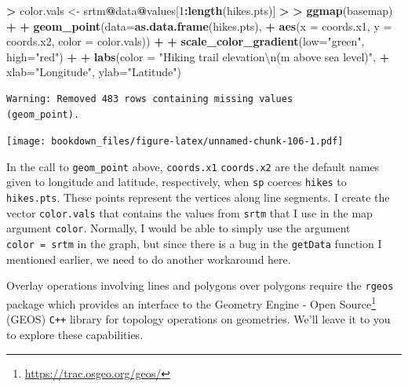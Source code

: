 \documentclass[]{krantz}
\makeatletter
\newenvironment{Shaded}{\begin{snugshade}}{\end{snugshade}}
\newcommand{\KeywordTok}[1]{\textcolor[rgb]{0.27,0.27,0.27}{\textbf{#1}}}
\newcommand{\DataTypeTok}[1]{\textcolor[rgb]{0.27,0.27,0.27}{#1}}
\newcommand{\DecValTok}[1]{\textcolor[rgb]{0.06,0.06,0.06}{#1}}
\newcommand{\CharTok}[1]{\textcolor[rgb]{0.5,0.5,0.5}{#1}}
\newcommand{\StringTok}[1]{\textcolor[rgb]{0.5,0.5,0.5}{#1}}
\newcommand{\OperatorTok}[1]{\textcolor[rgb]{0.43,0.43,0.43}{\textbf{#1}}}
\newcommand{\ErrorTok}[1]{\textcolor[rgb]{0.14,0.14,0.14}{\textbf{#1}}}
\newcommand{\NormalTok}[1]{#1}
\renewcommand{\href}[2]{#2\footnote{\url{#1}}}
\newenvironment{kframe}{%
\medskip{}
\setlength{\fboxsep}{.8em}
 \def\at@end@of@kframe{}%
 \ifinner\ifhmode%
  \def\at@end@of@kframe{\end{minipage}}%
  \begin{minipage}{\columnwidth}%
 \fi\fi%
 \def\FrameCommand##1{\hskip\@totalleftmargin \hskip-\fboxsep
 \colorbox{shadecolor}{##1}\hskip-\fboxsep
     \hskip-\linewidth \hskip-\@totalleftmargin \hskip\columnwidth}%
 \MakeFramed {\advance\hsize-\width
   \@totalleftmargin\z@ \linewidth\hsize
   \@setminipage}}%
 {\par\unskip\endMakeFramed%
 \at@end@of@kframe}
\renewenvironment{Shaded}{\begin{kframe}}{\end{kframe}}
\theoremstyle{definition}
\theoremstyle{definition}
\theoremstyle{definition}
\theoremstyle{remark}
\makeatother
\begin{document}
\begin{Shaded}
\begin{Highlighting}[]
\OperatorTok{>}\StringTok{ }\NormalTok{color.vals <-}\StringTok{ }\NormalTok{srtm}\OperatorTok{@}\NormalTok{data}\OperatorTok{@}\NormalTok{values[}\DecValTok{1}\OperatorTok{:}\KeywordTok{length}\NormalTok{(hikes.pts)]}
\OperatorTok{>}\StringTok{ }
\ErrorTok{>}\StringTok{ }\KeywordTok{ggmap}\NormalTok{(basemap) }\OperatorTok{+}
\OperatorTok{+}\StringTok{     }\KeywordTok{geom_point}\NormalTok{(}\DataTypeTok{data=}\KeywordTok{as.data.frame}\NormalTok{(hikes.pts),}
\OperatorTok{+}\StringTok{                }\KeywordTok{aes}\NormalTok{(}\DataTypeTok{x =}\NormalTok{ coords.x1, }\DataTypeTok{y =}\NormalTok{ coords.x2, }\DataTypeTok{color =}\NormalTok{ color.vals)) }\OperatorTok{+}
\OperatorTok{+}\StringTok{     }\KeywordTok{scale_color_gradient}\NormalTok{(}\DataTypeTok{low=}\StringTok{"green"}\NormalTok{, }\DataTypeTok{high=}\StringTok{"red"}\NormalTok{) }\OperatorTok{+}
\OperatorTok{+}\StringTok{     }\KeywordTok{labs}\NormalTok{(}\DataTypeTok{color =} \StringTok{"Hiking trail elevation}\CharTok{\textbackslash{}n}\StringTok{(m above sea level)"}\NormalTok{,}
\OperatorTok{+}\StringTok{          }\DataTypeTok{xlab=}\StringTok{"Longitude"}\NormalTok{, }\DataTypeTok{ylab=}\StringTok{"Latitude"}\NormalTok{)}
\end{Highlighting}
\end{Shaded}

\begin{verbatim}
Warning: Removed 483 rows containing missing values
(geom_point).
\end{verbatim}

\texttt{[image: bookdown\_files/figure-latex/unnamed-chunk-106-1.pdf]}

In the call to \texttt{geom\_point} above, \texttt{coords.x1}
\texttt{coords.x2} are the default names given to longitude and
latitude, respectively, when \texttt{sp} coerces \texttt{hikes} to
\texttt{hikes.pts}. These points represent the vertices along line
segments. I create the vector \texttt{color.vals} that contains the
values from \texttt{srtm} that I use in the map argument \texttt{color}.
Normally, I would be able to simply use the argument
\texttt{color\ =\ srtm} in the graph, but since there is a bug in the
\texttt{getData} function I mentioned earlier, we need to do another
workaround here.

Overlay operations involving lines and polygons over polygons require
the \texttt{rgeos} package which provides an interface to the
\href{https://trac.osgeo.org/geos/}{Geometry Engine - Open Source}
(GEOS) \texttt{C++} library for topology operations on geometries. We'll
leave it to you to explore these capabilities.
\end{document}
